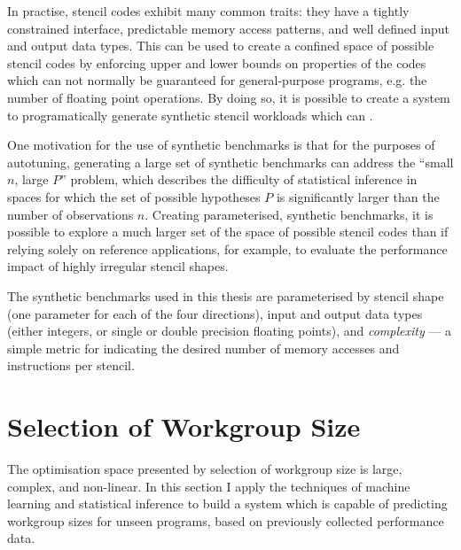 In practise, stencil codes exhibit many common traits: they have a
tightly constrained interface, predictable memory access patterns, and
well defined input and output data types. This can be used to create a
confined space of possible stencil codes by enforcing upper and lower
bounds on properties of the codes which can not normally be guaranteed
for general-purpose programs, e.g. the number of floating point
operations. By doing so, it is possible to create a system to
programatically generate synthetic stencil workloads which can
\TODO{\ldots}.

One motivation for the use of synthetic benchmarks is that for the
purposes of autotuning, generating a large set of synthetic benchmarks
can address the ``small $n$, large $P$'' problem, which describes the
difficulty of statistical inference in spaces for which the set of
possible hypotheses $P$ is significantly larger than the number of
observations $n$\CitationNeeded{}. Creating parameterised, synthetic
benchmarks, it is possible to explore a much larger set of the space
of possible stencil codes than if relying solely on reference
applications, for example, to evaluate the performance impact of
highly irregular stencil shapes.


The synthetic benchmarks used in this thesis are parameterised by
stencil shape (one parameter for each of the four directions), input
and output data types (either integers, or single or double precision
floating points), and \emph{complexity} --- a simple metric for
indicating the desired number of memory accesses and instructions per
stencil.


\section{Selection of Workgroup Size}

The optimisation space presented by selection of workgroup size is
large, complex, and non-linear. In this section I apply the techniques
of machine learning and statistical inference to build a system which
is capable of predicting workgroup sizes for unseen programs, based on
previously collected performance data.


